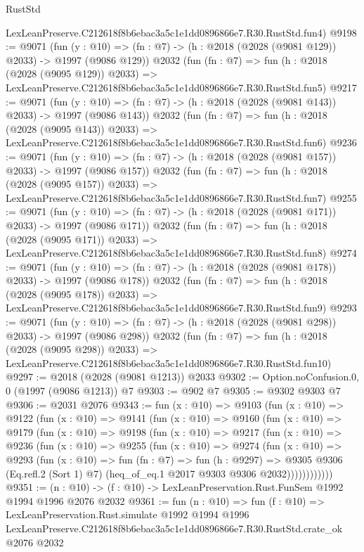 \begin{lexlean}{RustStd}
\begin{coremodule}
    LexLeanPreserve.C212618f8b6ebac3a5c1e1dd0896866e7.R30.RustStd.fun4)
@9198 := @9071
    (fun (y : @10) => (fn : @7) -> (h : @2018 (@2028 (@9081 @129)) @2033) -> @1997 (@9086 @129))
    @2032
    (fun (fn : @7) =>
    fun (h : @2018 (@2028 (@9095 @129)) @2033) =>
    LexLeanPreserve.C212618f8b6ebac3a5c1e1dd0896866e7.R30.RustStd.fun5)
@9217 := @9071
    (fun (y : @10) => (fn : @7) -> (h : @2018 (@2028 (@9081 @143)) @2033) -> @1997 (@9086 @143))
    @2032
    (fun (fn : @7) =>
    fun (h : @2018 (@2028 (@9095 @143)) @2033) =>
    LexLeanPreserve.C212618f8b6ebac3a5c1e1dd0896866e7.R30.RustStd.fun6)
@9236 := @9071
    (fun (y : @10) => (fn : @7) -> (h : @2018 (@2028 (@9081 @157)) @2033) -> @1997 (@9086 @157))
    @2032
    (fun (fn : @7) =>
    fun (h : @2018 (@2028 (@9095 @157)) @2033) =>
    LexLeanPreserve.C212618f8b6ebac3a5c1e1dd0896866e7.R30.RustStd.fun7)
@9255 := @9071
    (fun (y : @10) => (fn : @7) -> (h : @2018 (@2028 (@9081 @171)) @2033) -> @1997 (@9086 @171))
    @2032
    (fun (fn : @7) =>
    fun (h : @2018 (@2028 (@9095 @171)) @2033) =>
    LexLeanPreserve.C212618f8b6ebac3a5c1e1dd0896866e7.R30.RustStd.fun8)
@9274 := @9071
    (fun (y : @10) => (fn : @7) -> (h : @2018 (@2028 (@9081 @178)) @2033) -> @1997 (@9086 @178))
    @2032
    (fun (fn : @7) =>
    fun (h : @2018 (@2028 (@9095 @178)) @2033) =>
    LexLeanPreserve.C212618f8b6ebac3a5c1e1dd0896866e7.R30.RustStd.fun9)
@9293 := @9071
    (fun (y : @10) => (fn : @7) -> (h : @2018 (@2028 (@9081 @298)) @2033) -> @1997 (@9086 @298))
    @2032
    (fun (fn : @7) =>
    fun (h : @2018 (@2028 (@9095 @298)) @2033) =>
    LexLeanPreserve.C212618f8b6ebac3a5c1e1dd0896866e7.R30.RustStd.fun10)
@9297 := @2018 (@2028 (@9081 @1213)) @2033
@9302 := Option.noConfusion.{0, 0} (@1997 (@9086 @1213)) @7
@9303 := @902 @7
@9305 := @9302 @9303 @7
@9306 := @2031 @2076
@9343 := fun (x : @10) =>
  @9103
    (fun (x : @10) =>
    @9122
      (fun (x : @10) =>
      @9141
        (fun (x : @10) =>
        @9160
          (fun (x : @10) =>
          @9179
            (fun (x : @10) =>
            @9198
              (fun (x : @10) =>
              @9217
                (fun (x : @10) =>
                @9236
                  (fun (x : @10) =>
                  @9255
                    (fun (x : @10) =>
                    @9274
                      (fun (x : @10) =>
                      @9293
                        (fun (x : @10) =>
                        fun (fn : @7) =>
                        fun (h : @9297) =>
                        @9305
                          @9306
                          (Eq.refl.{2} (Sort 1) @7)
                          (heq_of_eq.{1} @2017 @9303 @9306 @2032))))))))))))
@9351 := (n : @10) -> (f : @10) -> LexLeanPreservation.Rust.FunSem @1992 @1994 @1996 @2076 @2032
@9361 := fun (n : @10) =>
  fun (f : @10) =>
  LexLeanPreservation.Rust.simulate
    @1992
    @1994
    @1996
    LexLeanPreserve.C212618f8b6ebac3a5c1e1dd0896866e7.R30.RustStd.crate_ok
    @2076
    @2032
\end{coremodule}
\end{lexlean}
